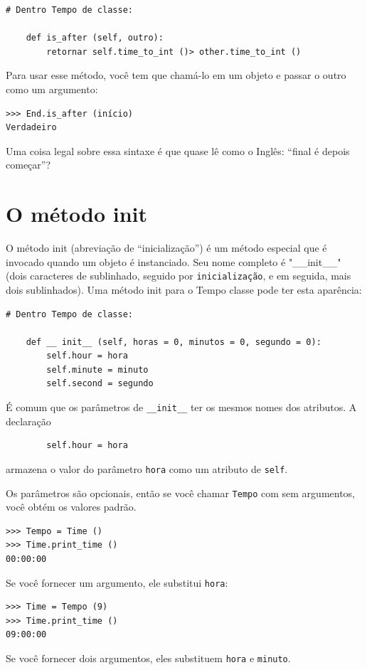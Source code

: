 \documentclass[10pt]{book}
\begin{document}
\begin{exercise}
\begin{v erbatim}
{\begin{verbatim}
# Dentro Tempo de classe:

    def is_after (self, outro):
        retornar self.time_to_int ()> other.time_to_int ()
\end{verbatim}
%
Para usar esse método, você tem que chamá-lo em um objeto e passar
o outro como um argumento:

\begin{verbatim}
>>> End.is_after (início)
Verdadeiro
\end{verbatim}
%
Uma coisa legal sobre essa sintaxe é que quase lê
como o Inglês: ``final é depois começar''?


\section{O método init}

O método init (abreviação de ``inicialização'') é
um método especial que é invocado quando um objeto é instanciado.  
Seu nome completo é \verbo "__init__" (dois caracteres de sublinhado,
seguido por {\tt inicialização}, e em seguida, mais dois sublinhados). Uma
método init para o {\tt} Tempo classe pode ter esta aparência:

\begin{verbatim}
# Dentro Tempo de classe:

    def __ init__ (self, horas = 0, minutos = 0, segundo = 0):
        self.hour = hora
        self.minute = minuto
        self.second = segundo
\end{verbatim}
%
É comum que os parâmetros de \verb "__init__"
ter os mesmos nomes dos atributos. A declaração

\begin{verbatim}
        self.hour = hora
\end{verbatim}
%
armazena o valor do parâmetro {\tt hora} como um atributo
de {\tt self}.

Os parâmetros são opcionais, então se você chamar {\tt Tempo} com
sem argumentos, você obtém os valores padrão.

\begin{verbatim}
>>> Tempo = Time ()
>>> Time.print_time ()
00:00:00
\end{verbatim}
%
Se você fornecer um argumento, ele substitui {\tt hora}:

\begin{verbatim}
>>> Time = Tempo (9)
>>> Time.print_time ()
09:00:00
\end{verbatim}
%
Se você fornecer dois argumentos, eles substituem {\tt hora} e
{\tt minuto}.

}
\end{v erbatim}
\end{exercise}
\end{document}
